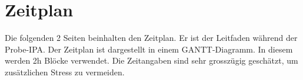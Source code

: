 \chapter{Zeitplan}\label{ch:zeitplan}
Die folgenden 2 Seiten beinhalten den Zeitplan. Er ist der Leitfaden während der Probe-IPA. Der Zeitplan ist dargestellt in einem GANTT-Diagramm\cite{gantt}. In diesem werden 2h Blöcke verwendet. Die Zeitangaben sind sehr grosszügig geschätzt, um zusätzlichen Stress zu vermeiden.
\begin{landscape}
	
\end{landscape}